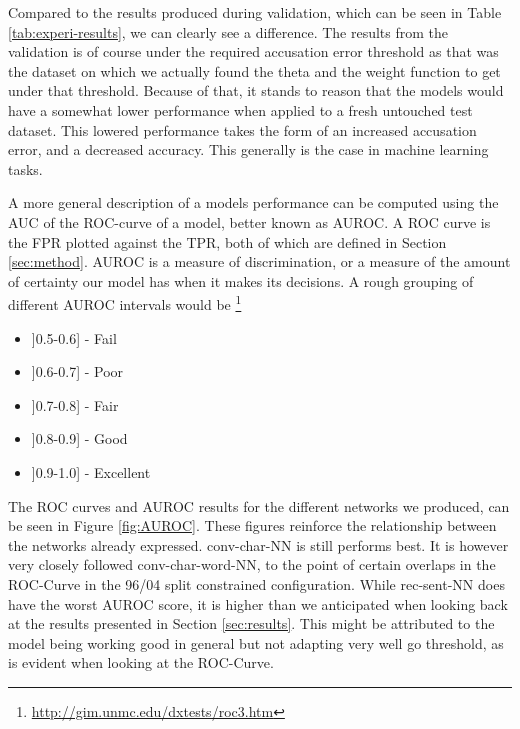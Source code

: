 Compared to the results produced during validation, which can be seen in
Table \ref{tab:experi-results}, we can clearly see a difference. The results
from the validation is of course under the required accusation error threshold
as that was the dataset on which we actually found the theta and the weight
function to get under that threshold. Because of that, it stands to reason that
the models would have a somewhat lower performance when applied to a fresh
untouched test dataset. This lowered performance takes the form of an increased
accusation error, and a decreased accuracy. This generally is the case in
machine learning tasks.

A more general description of a models performance can be computed using the
\gls{AUC} of the \gls{ROC}-curve of a model, better known as \gls{AUROC}.
A \gls{ROC} curve is the \gls{FPR} plotted against the \gls{TPR}, both of
which are defined in Section \ref{sec:method}. \gls{AUROC} is a measure of
discrimination, or a measure of the amount of certainty our model has when it
makes its decisions. A rough grouping of different \gls{AUROC} intervals would
be \footnote{\url{http://gim.unmc.edu/dxtests/roc3.htm}}

\begin{itemize}
\item ]0.5-0.6] - Fail
\item ]0.6-0.7] - Poor
\item ]0.7-0.8] - Fair
\item ]0.8-0.9] - Good
\item ]0.9-1.0] - Excellent
\end{itemize}

The ROC curves and AUROC results for the different networks we produced, can
be seen in Figure \ref{fig:AUROC}. These figures reinforce the relationship
between the networks already expressed. \gls{conv-char-NN} is still performs
best. It is however very closely followed \gls{conv-char-word-NN}, to the
point of certain overlaps in the ROC-Curve in the 96/04 split constrained
configuration. While \gls{rec-sent-NN} does have the worst AUROC score, it is
higher than we anticipated when looking back at the results presented in Section
\ref{sec:results}. This might be attributed to the model being working good in
general but not adapting very well go threshold, as is evident when looking at
the ROC-Curve.

